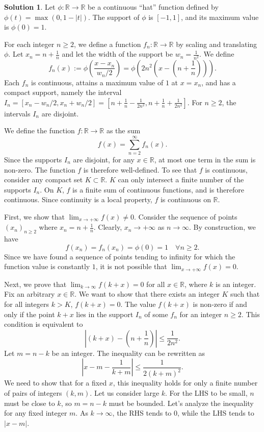 \documentclass[12pt]{article}
\theoremstyle{definition}
\newtheorem*{solution}{\normalfont\textbf{Solution}}
\begin{document}
\begin{enumerate}[leftmargin=*]
\begin{solution}
            Let $\phi: \mathbb{R} \to \mathbb{R}$ be a continuous ``hat'' function defined by $\phi(t) = \max(0, 1 - |t|)$. The support of $\phi$ is $[-1, 1]$, and its maximum value is $\phi(0) = 1$.

            For each integer $n \ge 2$, we define a function $f_n: \mathbb{R} \to \mathbb{R}$ by scaling and translating $\phi$. Let $x_n = n + \frac{1}{n}$ and let the width of the support be $w_n = \frac{1}{n^2}$. We define
            \[ f_n(x) := \phi\left(\frac{x - x_n}{w_n/2}\right) = \phi\left(2n^2\left(x - \left(n + \frac{1}{n}\right)\right)\right). \]
            Each $f_n$ is continuous, attains a maximum value of $1$ at $x=x_n$, and has a compact support, namely the interval $I_n = [x_n - w_n/2, x_n + w_n/2] = [n + \frac{1}{n} - \frac{1}{2n^2}, n + \frac{1}{n} + \frac{1}{2n^2}]$. For $n \ge 2$, the intervals $I_n$ are disjoint.

            We define the function $f: \mathbb{R} \to \mathbb{R}$ as the sum
            \[ f(x) = \sum_{n=2}^{\infty} f_n(x). \]
            Since the supports $I_n$ are disjoint, for any $x \in \mathbb{R}$, at most one term in the sum is non-zero. The function $f$ is therefore well-defined. To see that $f$ is continuous, consider any compact set $K \subset \mathbb{R}$. $K$ can only intersect a finite number of the supports $I_n$. On $K$, $f$ is a finite sum of continuous functions, and is therefore continuous. Since continuity is a local property, $f$ is continuous on $\mathbb{R}$.

            First, we show that $\lim_{x \to +\infty} f(x) \neq 0$. Consider the sequence of points $(x_n)_{n \ge 2}$ where $x_n = n + \frac{1}{n}$. Clearly, $x_n \to +\infty$ as $n \to \infty$. By construction, we have
            \[ f(x_n) = f_n(x_n) = \phi(0) = 1 \quad \forall n \ge 2. \]
            Since we have found a sequence of points tending to infinity for which the function value is constantly $1$, it is not possible that $\lim_{x \to +\infty} f(x) = 0$.

            Next, we prove that $\lim_{k \to \infty} f(k + x) = 0$ for all $x \in \mathbb{R}$, where $k$ is an integer. Fix an arbitrary $x \in \mathbb{R}$. We want to show that there exists an integer $K$ such that for all integers $k > K$, $f(k+x) = 0$.
            The value $f(k+x)$ is non-zero if and only if the point $k+x$ lies in the support $I_n$ of some $f_n$ for an integer $n \ge 2$. This condition is equivalent to
            \[ \left| (k+x) - \left(n + \frac{1}{n}\right) \right| \le \frac{1}{2n^2}. \]
            Let $m = n-k$ be an integer. The inequality can be rewritten as
            \[ \left| x - m - \frac{1}{k+m} \right| \le \frac{1}{2(k+m)^2}. \]
            We need to show that for a fixed $x$, this inequality holds for only a finite number of pairs of integers $(k, m)$.
            Let us consider large $k$. For the LHS to be small, $n$ must be close to $k$, so $m=n-k$ must be bounded. Let's analyze the inequality for any fixed integer $m$. As $k \to \infty$, the RHS tends to $0$, while the LHS tends to $|x-m|$.
            

\end{solution}
\end{enumerate}
\end{document}

